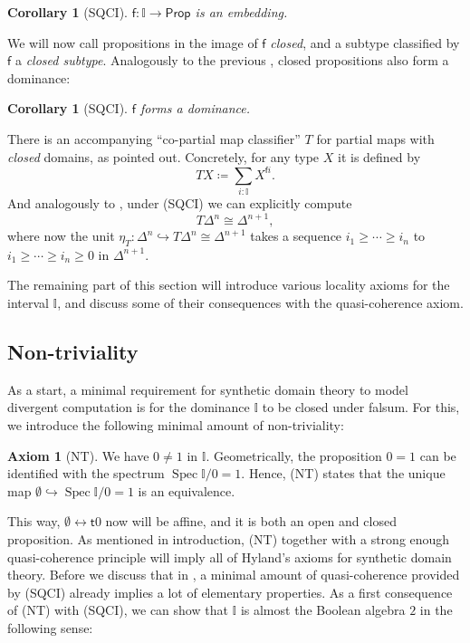 \documentclass[a4paper,12pt]{amsart}
\newtheorem{corollary}[theorem]{Corollary}
\theoremstyle{definition}
\newtheorem*{axiom}{Axiom}
\newcommand{\mbb}[1]{\mathbb{#1}}
\newcommand{\I}{\mbb I}
\newcommand{\ms}[1]{\mathsf{#1}}
\newcommand{\hook}{\hookrightarrow}
\newcommand{\emp}{\emptyset}
\newcommand{\eq}{\leftrightarrow}
\newcommand{\pp}{\ms{Prop}}
\newcommand{\spec}{\operatorname{Spec}}
\begin{document}
\begin{corollary}[SQCI]
  $\ms f \colon \I \to \pp$ is an embedding.
\end{corollary}

We will now call propositions in the image of $\ms f$ \emph{closed}, and a subtype classified by $\ms f$ a \emph{closed subtype}. Analogously to the previous , closed propositions also form a dominance:

\begin{corollary}[SQCI]\label{cor:dualisdominance}
  $\ms f$ forms a dominance.
\end{corollary}

There is an accompanying ``co-partial map classifier'' $T$ for partial maps with \emph{closed} domains, as \citet{hyland1990first} pointed out. Concretely, for any type $X$ it is defined by
\[ T X \coloneq \sum_{i:\I} X^{\ms fi}. \]
And analogously to , under (SQCI) we can explicitly compute 
\[ T\Delta^n \cong \Delta^{n+1}, \]
where now the unit $\eta_T \colon \Delta^n \hook T\Delta^n \cong \Delta^{n+1}$ takes a sequence $i_1 \ge \cdots \ge i_n$ to $i_1 \ge \cdots \ge i_n \ge 0$ in $\Delta^{n+1}$. 

The remaining part of this section will introduce various locality axioms for the interval $\I$, and discuss some of their consequences with the quasi-coherence axiom.

\subsection{Non-triviality}

As a start, a minimal requirement for synthetic domain theory to model divergent computation is for the dominance $\I$ to be closed under falsum. For this, we introduce the following minimal amount of non-triviality:

\begin{axiom}[NT]\label{ax:nt}
  We have $0 \neq 1$ in $\I$. Geometrically, the proposition $0 = 1$ can be identified with the spectrum $\spec\I/0=1$. Hence, (NT) states that the unique map $\emp \hook \spec\I/0=1$ is an equivalence.
\end{axiom}

This way, $\emp \eq \ms t0$ now will be affine, and it is both an open and closed proposition. As mentioned in introduction, (NT) together with a strong enough quasi-coherence principle will imply all of Hyland's axioms for synthetic domain theory. Before we discuss that in , a minimal amount of quasi-coherence provided by (SQCI) already implies a lot of elementary properties. As a first consequence of (NT) with (SQCI), we can show that $\I$ is almost the Boolean algebra $2$ in the following sense:
\end{document}
